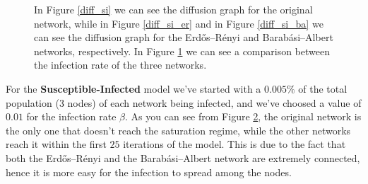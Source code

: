 \begin{figure}[H]
        \begin{subfigure}{0.45\textwidth}
            \caption{}
            \label{diff_si_comparison}
        \end{subfigure}
        \caption{In Figure \ref{diff_si} we can see the diffusion graph for the original network, while in Figure
        \ref{diff_si_er} and in Figure \ref{diff_si_ba} we can see the diffusion graph for the Erdős–Rényi and
        Barabási–Albert networks, respectively. In Figure \ref{diff_si_comparison} we can see a comparison between
        the infection rate of the three networks.}
        \label{diff_si_total}
    \end{figure}
    For the \textbf{Susceptible-Infected} model we've started with a $0.005\%$ of the total population ($3$ nodes)
    of each network being infected, and we've choosed a value of $0.01$ for the infection rate $\beta$. As you can
    see from Figure \ref{diff_si_total}, the original network is the only one that doesn't reach the saturation
    regime, while the other networks reach it within the first $25$ iterations of the model. This is due to the fact
    that both the Erdős–Rényi and the Barabási–Albert network are extremely connected, hence it is more easy for the
    infection to spread among the nodes.


